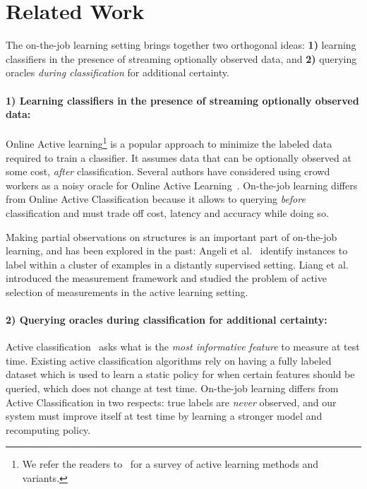 \section{Related Work}
\label{sec:related}

The on-the-job learning setting brings together two orthogonal ideas: \textbf{1)} learning classifiers in the presence of streaming optionally observed data, and \textbf{2)} querying oracles {\em during classification} for additional certainty.

\paragraph{1) Learning classifiers in the presence of streaming optionally observed data:}

Online Active learning\footnote{We refer the readers to~\cite{settles2010active} for a survey of active learning methods and variants.} is a popular approach to minimize the labeled data required to train a classifier. It assumes data that can be optionally observed at some cost, {\em after} classification.
Several authors have considered using crowd workers as a noisy oracle for Online Active Learning~\cite{donmez2008proactive,golovin2010near,yan2011active,vijayanarasimhan2014large}.
On-the-job learning differs from Online Active Classification because it allows to querying {\em before} classification and must trade off cost, latency and accuracy while doing so.

Making partial observations on structures is an important part of on-the-job learning, and has been explored in the past:
Angeli et al.~\cite{angeli2014combining} identify instances to label within a cluster of examples in a distantly supervised setting.
Liang et al.~\cite{liang09measurements} introduced the measurement framework and studied the problem of active selection of measurements in the active learning setting.

\paragraph{2) Querying oracles during classification for additional certainty:}

Active classification~\cite{greiner2002learning,chai2004test,esmeir2007anytime} asks what is the {\em most informative feature\/} to measure at test time.
Existing active classification algorithms rely on having a fully labeled dataset which is used to learn a static policy for when certain features should be queried, which does not change at test time.
On-the-job learning differs from Active Classification in two respects: true labels are {\em never} observed, and our system must improve itself at test time by learning a stronger model and recomputing policy.

